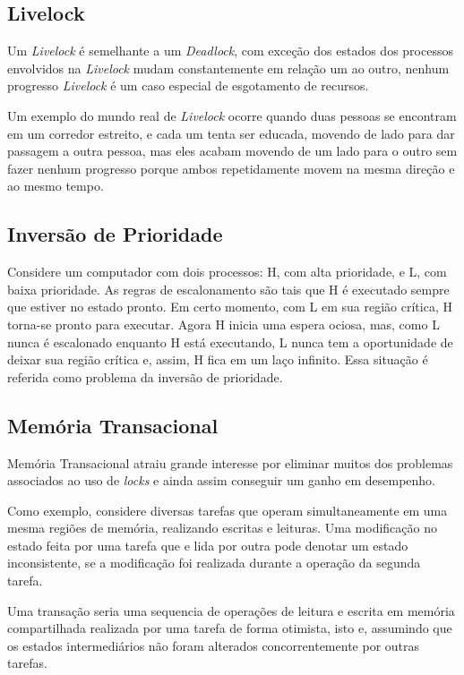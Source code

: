 \subsection{Livelock}

Um \textit{Livelock} é semelhante a um \textit{Deadlock}, com exceção dos estados dos processos envolvidos na 
\textit{Livelock} mudam constantemente em relação um ao outro, nenhum progresso \textit{Livelock} é um caso 
especial de esgotamento de recursos.

Um exemplo do mundo real de \textit{Livelock} ocorre quando duas pessoas se encontram em um corredor 
estreito, e cada um tenta ser educada, movendo de lado para  dar passagem a outra pessoa, 
mas eles acabam movendo de um lado para o outro sem fazer nenhum progresso porque ambos 
repetidamente movem na mesma direção e ao mesmo tempo.

\subsection{Inversão de Prioridade}

Considere um computador com dois processos: H, com alta prioridade, e L, com baixa prioridade. 
As regras de escalonamento são tais que H é executado sempre que estiver no estado pronto. 
Em certo momento, com L em sua região crítica, H torna-se pronto para executar. Agora H inicia 
uma espera ociosa, mas, como L nunca é escalonado enquanto H está executando, L nunca tem a 
oportunidade de deixar sua região crítica e, assim, H fica em um laço infinito. Essa situação 
é referida como problema da inversão de prioridade.

\subsection{Memória Transacional}

Memória Transacional atraiu grande interesse por eliminar muitos dos 
problemas associados ao uso de \textit{locks} e ainda assim conseguir um ganho em desempenho.


Como exemplo, considere diversas tarefas que operam simultaneamente em uma mesma regiões 
de memória, realizando escritas e leituras. Uma modificação no estado feita por uma tarefa 
que e lida por outra pode denotar um estado inconsistente, se a modificação foi realizada 
durante a operação da segunda tarefa.

Uma transação seria uma sequencia de operações de leitura e escrita em memória compartilhada 
realizada por uma tarefa de forma otimista, isto e, assumindo que os estados intermediários 
não foram alterados
 concorrentemente por outras tarefas.


